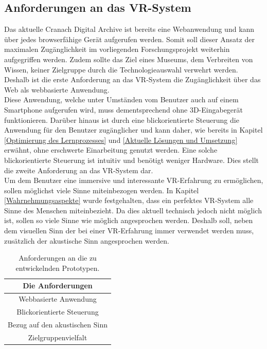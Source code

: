 \documentclass[a4paper,12pt,oneside]{article}
\begin{document}
    \subsection{Anforderungen an das VR-System}
      Das aktuelle Cranach Digital Archive ist bereits eine Webanwendung und kann 
      über jedes browserfähige Gerät aufgerufen werden. Somit soll dieser Ansatz 
      der maximalen Zugänglichkeit im vorliegenden Forschungsprojekt 
      weiterhin aufgegriffen werden.
      Zudem sollte das Ziel eines Museums, dem Verbreiten von Wissen, keiner Zielgruppe
      durch die Technologieauswahl verwehrt werden.
      Deshalb ist die erste Anforderung an das VR-System die Zugänglichkeit
      über das Web als webbasierte Anwendung. \\
      Diese Anwendung, welche unter Umständen vom Benutzer auch auf einem 
      Smartphone aufgerufen wird, muss dementsprechend ohne 
      3D-Eingabegerät funktionieren.
      Darüber hinaus ist durch eine blickorientierte Steuerung die Anwendung für
      den Benutzer zugänglicher und kann daher, wie bereits in
      Kapitel \ref{Optimierung des Lernprozesses}
      und \ref{Aktuelle Lösungen und Umsetzung} erwähnt, ohne erschwerte Einarbeitung
      genutzt werden. 
      Eine solche blickorientierte Steuerung ist intuitiv und benötigt weniger
      Hardware. Dies stellt die zweite Anforderung an das VR-System dar. \\
      Um dem Benutzer eine immersive und interessante VR-Erfahrung zu ermöglichen, sollen
      möglichst viele Sinne miteinbezogen werden. In Kapitel \ref{Wahrnehmungsaspekte}
      wurde festgehalten, dass ein perfektes VR-System alle Sinne des Menschen miteinbezieht.
      Da dies aktuell technisch jedoch nicht möglich ist, sollen so viele Sinne
      wie möglich angesprochen werden. Deshalb soll, neben dem
      visuellen Sinn der bei einer VR-Erfahrung immer
      verwendet werden muss, zusätzlich der akustische Sinn angesprochen werden.
      \begin{table}[h]
        \begin{center}
          \begin{tabular}{| c |}
            \hline
            \textbf{Die Anforderungen} \\ \hline
            Webbasierte Anwendung \\ \hline
            Blickorientierte Steuerung \\ \hline
            Bezug auf den akustischen Sinn \\ \hline
            Zielgruppenvielfalt \\ \hline
          \end{tabular}
          \caption{Anforderungen an die zu entwickelnden Prototypen.\label{tab:anforderungen}}
        \end{center}
      \end{table} \\
\end{document}
